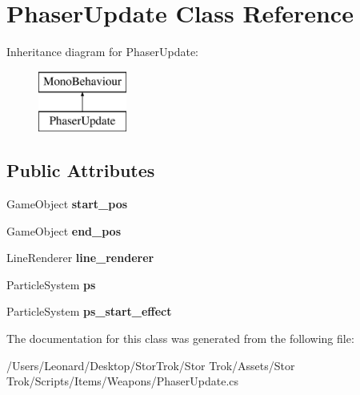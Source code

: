 \hypertarget{class_phaser_update}{}\section{Phaser\+Update Class Reference}
\label{class_phaser_update}
Inheritance diagram for Phaser\+Update\+:\begin{figure}[H]
\begin{center}
\leavevmode
\includegraphics[height=2.000000cm]{class_phaser_update}
\end{center}
\end{figure}
\subsection*{Public Attributes}
\begin{DoxyCompactItemize}
\item 
\mbox{\label{class_phaser_update_a6f83ab1e033f1275b7be520aab8217f0}} 
Game\+Object {\bfseries start\+\_\+pos}
\item 
\mbox{\label{class_phaser_update_a716484ebe41feff50e05cf7445959351}} 
Game\+Object {\bfseries end\+\_\+pos}
\item 
\mbox{\label{class_phaser_update_a312a36bd5a7009cc43085f946fe6be20}} 
Line\+Renderer {\bfseries line\+\_\+renderer}
\item 
\mbox{\label{class_phaser_update_a40e772cc7fed108a7e1a844a46140882}} 
Particle\+System {\bfseries ps}
\item 
\mbox{\label{class_phaser_update_a382e0d3bbe954f03f6d02bfcddb0dc0a}} 
Particle\+System {\bfseries ps\+\_\+start\+\_\+effect}
\end{DoxyCompactItemize}


The documentation for this class was generated from the following file\+:\begin{DoxyCompactItemize}
\item 
/\+Users/\+Leonard/\+Desktop/\+Stor\+Trok/\+Stor Trok/\+Assets/\+Stor Trok/\+Scripts/\+Items/\+Weapons/Phaser\+Update.\+cs\end{DoxyCompactItemize}
